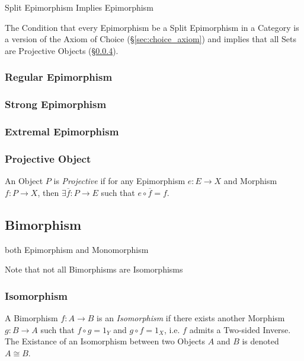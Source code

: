 Split Epimorphism Implies Epimorphism

The Condition that every Epimorphism be a Split Epimorphism in a
Category is a version of the Axiom of Choice
(\S\ref{sec:choice_axiom}) and implies that all Sets are Projective
Objects (\S\ref{sec:projective_object}).\cite{awodey06}



\subsubsection{Regular Epimorphism}\label{sec:regular_epimorphism}

\subsubsection{Strong Epimorphism}\label{sec:strong_epimorphism}

\subsubsection{Extremal Epimorphism}\label{sec:extremal_epimorphism}

\subsubsection{Projective Object}\label{sec:projective_object}

An Object $P$ is \emph{Projective} if for any Epimorphism $e : E
\rightarrow X$ and Morphism $f : P \rightarrow X$, then $\exists
\overline{f} : P \rightarrow E$ such that $e \circ \overline{f} = f$.



\subsection{Bimorphism}\label{sec:bimorphism}

both Epimorphism and Monomorphism

\fist Note that not all Bimorphisms are Isomorphisms



\subsubsection{Isomorphism}\label{sec:isomorphism}

A Bimorphism $f : A \rightarrow B$ is an \emph{Isomorphism} if there
exists another Morphism $g : B \rightarrow A$ such that $f \circ g =
1_Y$ and $g \circ f = 1_X$, i.e. $f$ admits a Two-sided Inverse. The
Existance of an Isomorphism between two Objects $A$ and $B$ is denoted
$A \cong B$.

